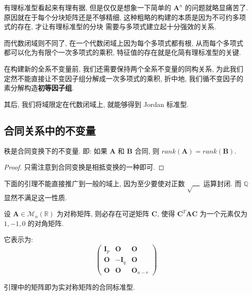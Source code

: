 \documentclass[UTF8]{book}
\begin{document}
有理标准型看起来有理有据, 但是仅仅是想象一下简单的 $\boldsymbol{A}^n$ 
的问题就略显痛苦了. 原因就在于每个分块矩阵还是不够精细, 
这种粗略的构建的本质是因为不可约多项式的存在, 才让有理标准型的分块
需要与多项式建立起十分强效的关系. 

而代数闭域则不同了, 在一个代数闭域上因为每个多项式都有根, 
从而每个多项式都可以化为有限个一次多项式的乘积, 
特征值的存在就是化简有理标准型的关键. 

在构建新的全系不变量前, 我们还需要保持两个全系不变量的同构关系, 
为此我们定然不能直接让不变因子组分解成一次多项式的乘积, 
折中地, 我们循不变因子的素分解构造\textbf{初等因子组}. 

其后, 我们将域限定在代数闭域上, 就能够得到 Jordan 标准型. 

\subsection{合同关系中的不变量}

\begin{proposition} \label{prop rank of congruence}
    秩是合同变换下的不变量. 
    即: 如果 $\boldsymbol{A}$ 和 $\boldsymbol{B}$ 合同, 
    则 $ rank(\boldsymbol{A}) = rank(\boldsymbol{B}) $.
\end{proposition}

\begin{proof}
    只需注意到合同变换是相抵变换的一种即可. 
\end{proof}

下面的引理不能直接推广到一般的域上, 
因为至少要使对正数 $ \sqrt{\quad} $ 运算封闭. 而 $\mathbb{Q}$ 显然不满足这一性质. 

\begin{lemma} \label{lemma congruence normal form}
    设 $\boldsymbol{A}\in \mathcal{M}_n(\mathbb{R})$ 为对称矩阵, 
    则必存在可逆矩阵 $\boldsymbol{C}$, 使得 
    $\boldsymbol{C}^T\boldsymbol{A}\boldsymbol{C}$ 
    为一个元素仅为 $1,-1,0$ 的对角矩阵. 
    
    它表示为: 
    $$
    \begin{pmatrix}
        \boldsymbol{I}_p & \boldsymbol{O} & \boldsymbol{O} \\
        \boldsymbol{O} &-\boldsymbol{I}_q & \boldsymbol{O} \\
        \boldsymbol{O} &\boldsymbol{O} & \boldsymbol{O}_{n-r} 
    \end{pmatrix}
    $$
\end{lemma}

引理中的矩阵即为实对称矩阵的合同标准型. 
\end{document}
